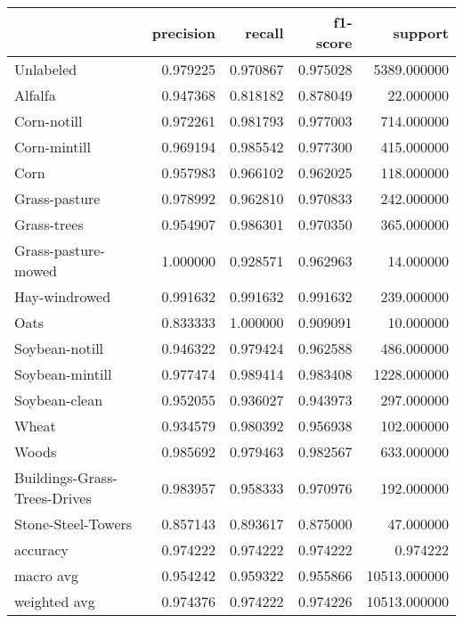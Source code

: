 \begin{tabular}{lrrrr}
\toprule
{} &  precision &    recall &  f1-score &       support \\
\midrule
Unlabeled                    &   0.979225 &  0.970867 &  0.975028 &   5389.000000 \\
Alfalfa                      &   0.947368 &  0.818182 &  0.878049 &     22.000000 \\
Corn-notill                  &   0.972261 &  0.981793 &  0.977003 &    714.000000 \\
Corn-mintill                 &   0.969194 &  0.985542 &  0.977300 &    415.000000 \\
Corn                         &   0.957983 &  0.966102 &  0.962025 &    118.000000 \\
Grass-pasture                &   0.978992 &  0.962810 &  0.970833 &    242.000000 \\
Grass-trees                  &   0.954907 &  0.986301 &  0.970350 &    365.000000 \\
Grass-pasture-mowed          &   1.000000 &  0.928571 &  0.962963 &     14.000000 \\
Hay-windrowed                &   0.991632 &  0.991632 &  0.991632 &    239.000000 \\
Oats                         &   0.833333 &  1.000000 &  0.909091 &     10.000000 \\
Soybean-notill               &   0.946322 &  0.979424 &  0.962588 &    486.000000 \\
Soybean-mintill              &   0.977474 &  0.989414 &  0.983408 &   1228.000000 \\
Soybean-clean                &   0.952055 &  0.936027 &  0.943973 &    297.000000 \\
Wheat                        &   0.934579 &  0.980392 &  0.956938 &    102.000000 \\
Woods                        &   0.985692 &  0.979463 &  0.982567 &    633.000000 \\
Buildings-Grass-Trees-Drives &   0.983957 &  0.958333 &  0.970976 &    192.000000 \\
Stone-Steel-Towers           &   0.857143 &  0.893617 &  0.875000 &     47.000000 \\
accuracy                     &   0.974222 &  0.974222 &  0.974222 &      0.974222 \\
macro avg                    &   0.954242 &  0.959322 &  0.955866 &  10513.000000 \\
weighted avg                 &   0.974376 &  0.974222 &  0.974226 &  10513.000000 \\
\bottomrule
\end{tabular}
